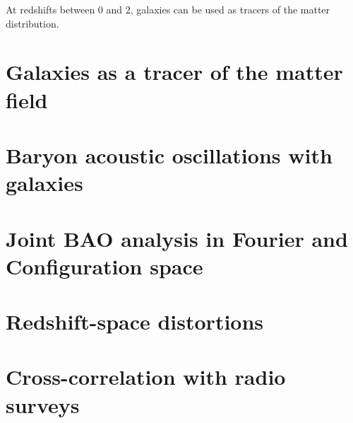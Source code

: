 \chaptertoc{}

At redshifts between 0 and 2, galaxies can be used as tracers of
the matter distribution. 

\section{Galaxies as a tracer of the matter field}

\section{Baryon acoustic oscillations with galaxies}

\section{Joint BAO analysis in Fourier and Configuration space}

\section{Redshift-space distortions}

\section{Cross-correlation with radio surveys}

